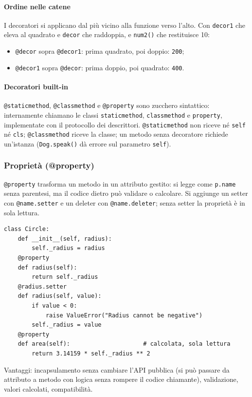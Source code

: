 \documentclass[a4paper,12pt]{article}
\begin{document}
\paragraph{Ordine nelle catene} I decoratori si applicano dal più vicino alla funzione verso
l'alto. Con \texttt{decor1} che eleva al quadrato e \texttt{decor} che raddoppia, e
\texttt{num2()} che restituisce 10:
\begin{itemize}[nosep]
  \item \texttt{@decor} sopra \texttt{@decor1}: prima quadrato, poi doppio: \texttt{200};
  \item \texttt{@decor1} sopra \texttt{@decor}: prima doppio, poi quadrato: \texttt{400}.
\end{itemize}

\paragraph{Decoratori built-in} \texttt{@staticmethod}, \texttt{@classmethod} e
\texttt{@property} sono zucchero sintattico: internamente chiamano le classi
\texttt{staticmethod}, \texttt{classmethod} e \texttt{property}, implementate con il protocollo
dei descrittori. \texttt{@staticmethod} non riceve né \texttt{self} né \texttt{cls};
\texttt{@classmethod} riceve la classe; un metodo senza decoratore richiede un'istanza
(\texttt{Dog.speak()} dà errore sul parametro \texttt{self}).

\subsubsection{Proprietà (@property)}
\texttt{@property} trasforma un metodo in un attributo gestito: si legge come \texttt{p.name}
senza parentesi, ma il codice dietro può validare o calcolare. Si aggiunge un setter con
\texttt{@name.setter} e un deleter con \texttt{@name.deleter}; senza setter la proprietà è in
sola lettura.
\begin{verbatim}
class Circle:
    def __init__(self, radius):
        self._radius = radius
    @property
    def radius(self):
        return self._radius
    @radius.setter
    def radius(self, value):
        if value < 0:
            raise ValueError("Radius cannot be negative")
        self._radius = value
    @property
    def area(self):                     # calcolata, sola lettura
        return 3.14159 * self._radius ** 2
\end{verbatim}
Vantaggi: incapsulamento senza cambiare l'API pubblica (si può passare da attributo a metodo
con logica senza rompere il codice chiamante), validazione, valori calcolati, compatibilità.
\end{document}

